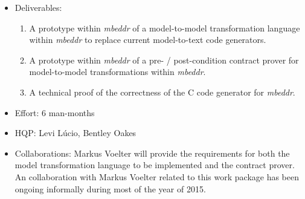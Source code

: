\begin{itemize}
  \item Deliverables:
  \begin{enumerate}
    \item A prototype within \emph{mbeddr} of a model-to-model transformation language
within \emph{mbeddr} to replace current model-to-text code generators.
	\item A prototype within \emph{mbeddr} of a pre- / post-condition contract prover for
model-to-model transformations within \emph{mbeddr}.
	\item A technical proof of the correctness of the C code generator for \emph{mbeddr}.
  \end{enumerate}
  \item Effort: 6 man-months
  \item HQP: Levi L\'ucio, Bentley Oakes
  \item Collaborations: Markus Voelter will provide the requirements for both
  the model transformation language to be implemented and the contract prover.
  An collaboration with Markus Voelter related to this work package has been ongoing
informally during most of the year of 2015.
\end{itemize}